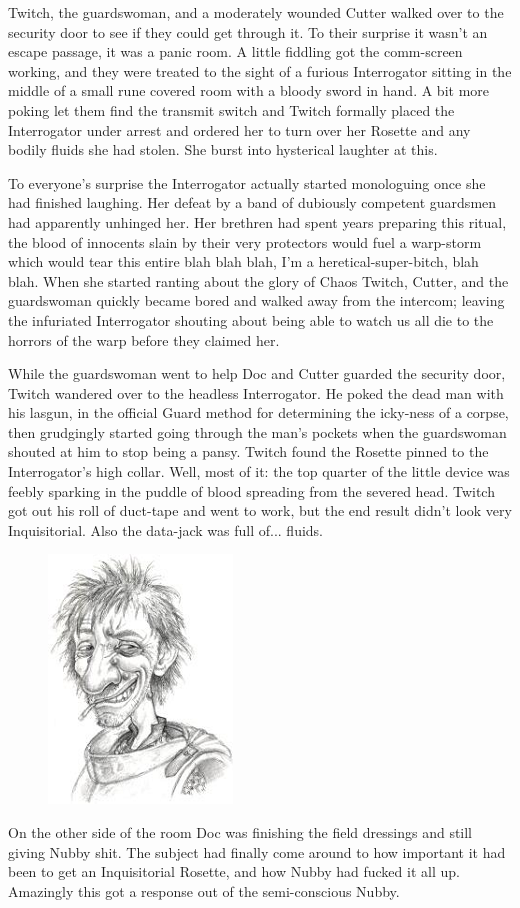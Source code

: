 Twitch, the guardswoman, and a moderately wounded Cutter walked over to the security door to see if they could get through it. 
To their surprise it wasn’t an escape passage, it was a panic room. 
A little fiddling got the comm-screen working, and they were treated to the sight of a furious Interrogator sitting in the middle of a small rune covered room with a bloody sword in hand. 
A bit more poking let them find the transmit switch and Twitch formally placed the Interrogator under arrest and ordered her to turn over her Rosette and any bodily fluids she had stolen. 
She burst into hysterical laughter at this.

To everyone’s surprise the Interrogator actually started monologuing once she had finished laughing. 
Her defeat by a band of dubiously competent guardsmen had apparently unhinged her.  
Her brethren had spent years preparing this ritual, the blood of innocents slain by their very protectors would fuel a warp-storm which would tear this entire blah blah blah, I’m a heretical-super-bitch, blah blah. 
When she started ranting about the glory of Chaos Twitch, Cutter, and the guardswoman quickly became bored and walked away from the intercom; 
leaving the infuriated Interrogator shouting about being able to watch us all die to the horrors of the warp before they claimed her.

While the guardswoman went to help Doc and Cutter guarded the security door, Twitch wandered over to the headless Interrogator. 
He poked the dead man with his lasgun, in the official Guard method for determining the icky-ness of a corpse, then grudgingly started going through the man’s pockets when the guardswoman shouted at him to stop being a pansy. 
Twitch found the Rosette pinned to the Interrogator’s high collar. 
Well, most of it: the top quarter of the little device was feebly sparking in the puddle of blood spreading from the severed head. 
Twitch got out his roll of duct-tape and went to work, but the end result didn’t look very Inquisitorial. 
Also the data-jack was full of... fluids.

\begin{figure}
	\begin{center}
		\includegraphics[width=\figwidth]{pics/5/38.png}
	\end{center}
\end{figure}
On the other side of the room Doc was finishing the field dressings and still giving Nubby shit. 
The subject had finally come around to how important it had been to get an Inquisitorial Rosette, and how Nubby had fucked it all up. 
Amazingly this got a response out of the semi-conscious Nubby.

